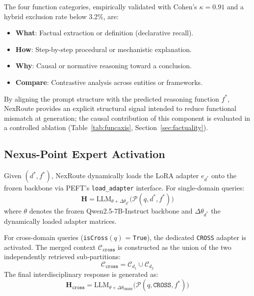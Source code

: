 \documentclass[a4paper,fleql,doubleblind]{cas-sc}
\begin{document}
The four function categories, empirically validated with Cohen's $\kappa = 0.91$ and a hybrid exclusion rate below 3.2\%, are:

\begin{itemize}
    \item \textbf{What}: Factual extraction or definition (declarative recall).
    \item \textbf{How}: Step-by-step procedural or mechanistic explanation.
    \item \textbf{Why}: Causal or normative reasoning toward a conclusion.
    \item \textbf{Compare}: Contrastive analysis across entities or frameworks.
\end{itemize}


By aligning the prompt structure with the predicted reasoning function $f^*$,
NexRoute provides an explicit structural signal intended to reduce functional
mismatch at generation; the causal contribution of this component is evaluated
in a controlled ablation (Table~\ref{tab:funcaxis}, Section~\ref{sec:factuality}).
\subsection{Nexus-Point Expert Activation}
\label{ssec:nexus}
Given $(d^*, f^*)$, NexRoute dynamically loads the LoRA adapter $e_{d^*}$
onto the frozen backbone via PEFT's \texttt{load\_adapter} interface.
For single-domain queries:
\begin{equation}
    \mathbf{H} = \text{LLM}_{\theta + \Delta\theta_{d^*}} \big(
    \mathcal{P}(q, d^*, f^*) \big)
    \label{eq:single}
\end{equation}
where $\theta$ denotes the frozen Qwen2.5-7B-Instruct backbone and
$\Delta\theta_{d^*}$ the dynamically loaded adapter matrices.

For cross-domain queries (\texttt{isCross}$(q)$ = \texttt{True}), the
dedicated \texttt{CROSS} adapter is activated. The merged context
$\mathcal{C}_{\texttt{cross}}$ is constructed as the union of the two
independently retrieved sub-partitions:
\begin{equation}
    \mathcal{C}_{\texttt{cross}} = \mathcal{C}_{d_1} \cup \mathcal{C}_{d_2}
    \label{eq:cross_ctx}
\end{equation}
The final interdisciplinary response is generated as:
\begin{equation}
    \mathbf{H}_{\texttt{cross}} = \text{LLM}_{\theta +
    \Delta\theta_{\texttt{CROSS}}}
    \big( \mathcal{P}(q, \texttt{CROSS}, f^*) \big)
    \label{eq:cross_gen}
\end{equation}
\end{document}
